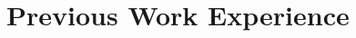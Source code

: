 \documentclass[10pt,letterpaper]{article}
\renewenvironment{itemize}{
  \begin{list}{}{
    \setlength{\leftmargin}{1.5em}
  }
}{
  \end{list}
}
\begin{document}


\section*{Previous Work Experience}
\end{document}
